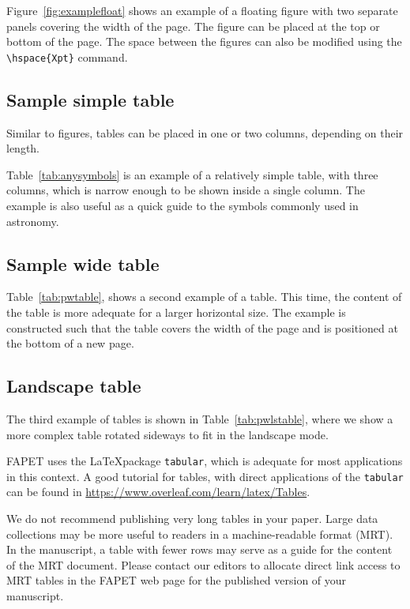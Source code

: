 \documentclass[9pt,article,twoside]{fapet-rho-class/fapet-rho}
\begin{document}
        Figure~\ref{fig:examplefloat} shows an example of a floating figure with two separate panels covering the width of the page. The figure can be placed at the top or bottom of the page. The space between the figures can also be modified using the \verb|\hspace{Xpt}| command.


    \subsection{Sample simple table}

        Similar to figures, tables can be placed in one or two columns, depending on their length.

        Table~\ref{tab:anysymbols} is an example of a relatively simple table, with three columns, which is narrow enough to be shown inside a single column. The example is also useful as a quick guide to the symbols commonly used in astronomy.

\subsection{Sample wide table}

        Table~\ref{tab:pwtable}, shows a second example of a table. This time, the content of the table is more adequate for a larger horizontal size. The example is constructed such that the table covers the width of the page and is positioned at the bottom of a new page.

\subsection{Landscape table}
    
 The third example of tables is shown in Table~\ref{tab:pwlstable}, where we show a more complex table rotated sideways to fit in the landscape mode. 

 FAPET uses the \LaTeX package \texttt{tabular}, which is adequate for most applications in this context. A good tutorial for tables, with direct applications of the \texttt{tabular} can be found in \url{https://www.overleaf.com/learn/latex/Tables}. 

 We do not recommend publishing very long tables in your paper. Large data collections may be more useful to readers in a machine-readable format (MRT). In the manuscript, a table with fewer rows may serve as a guide for the content of the MRT document. Please contact our editors to allocate direct link access to MRT tables in the FAPET web page for the published version of your manuscript. 
\end{document}
